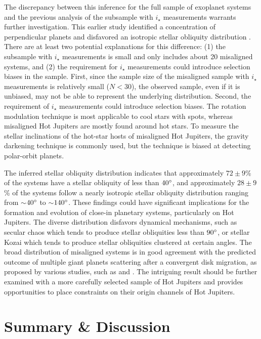 \documentclass[twocolumn,times,linenumbers]{aastex631}
\begin{document}
The discrepancy between this inference for the full sample of exoplanet systems and the previous analysis of the subsample with $i_\star$ measurements \citep{Albrecht21} warrants further investigation.
This earlier study identified a concentration of perpendicular planets and disfavored an isotropic stellar obliquity distribution \citep{Albrecht21}.
There are at least two potential explanations for this difference: (1) the subsample with $i_\star$ measurements is small and only includes about 20 misaligned systems, and (2) the requirement for $i_\star$ measurements could introduce selection biases in the sample. 
First, since the sample size of the misaligned sample with $i_\star$ measurements is relatively small ($N < 30$), the observed sample, even if it is unbiased, may not be able to represent the underlying distribution.
Second, the requirement of $i_\star$ measurements could introduce selection biases. The rotation modulation technique is most applicable to cool stars with spots, whereas misaligned Hot Jupiters are mostly found around hot stars. To measure the stellar inclinations of the hot-star hosts of misaligned Hot Jupiters, the gravity darkening technique is commonly used, but the technique is biased at detecting polar-orbit planets.

The inferred stellar obliquity distribution indicates that approximately $72\pm9$\% of the systems have a stellar obliquity of less than $40\mbox{$^\circ$}$, and approximately $28\pm9$\% of the systems follow a nearly isotropic stellar obliquity distribution ranging from $\sim$$40\mbox{$^\circ$}$ to $\sim$$140\mbox{$^\circ$}$. These findings could have significant implications for the formation and evolution of close-in planetary systems, particularly on Hot Jupiters. The diverse distribution disfavors dynamical mechanisms, such as secular chaos which tends to produce stellar obliquities less than $90\mbox{$^\circ$}$, or stellar Kozai which tends to produce stellar obliquities clustered at certain angles.
The broad distribution of misaligned systems is in good agreement with the predicted outcome of multiple giant planets scattering after a convergent disk migration, as proposed by various studies, such as \cite{Nagasawa11} and \cite{Beague12}. The intriguing result should be further examined with a more carefully selected sample of Hot Jupiters and provides opportunities to place constraints on their origin channels of Hot Jupiters.

\section{Summary \& Discussion}
\end{document}
